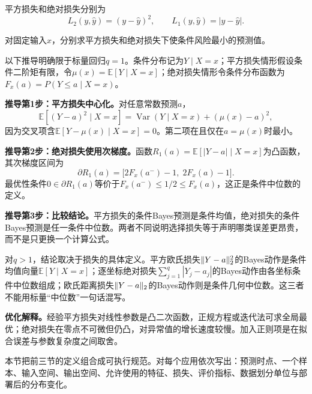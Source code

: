 平方损失和绝对损失分别为
\[
L_2(y,\hat y)=(y-\hat y)^2,\qquad
L_1(y,\hat y)=|y-\hat y|.
\]

\begin{derivationgoalbox}
对固定输入$x$，分别求平方损失和绝对损失下使条件风险最小的预测值。
\end{derivationgoalbox}
\begin{derivationprepbox}
以下推导明确限于标量回归$q=1$。条件分布记为$Y\mid X=x$；平方损失情形假设条件二阶矩有限，令$\mu(x)=\mathbb E[Y\mid X=x]$；绝对损失情形令条件分布函数为$F_x(a)=P(Y\le a\mid X=x)$。
\end{derivationprepbox}
\textbf{推导第1步：平方损失中心化。}对任意常数预测$a$，
\[
\mathbb E[(Y-a)^2\mid X=x]
=\operatorname{Var}(Y\mid X=x)+(\mu(x)-a)^2,
\]
因为交叉项含$\mathbb E[Y-\mu(x)\mid X=x]=0$。第二项在且仅在$a=\mu(x)$时最小。

\textbf{推导第2步：绝对损失使用次梯度。}函数$R_1(a)=\mathbb E[|Y-a|\mid X=x]$为凸函数，其次梯度区间为
\[
\partial R_1(a)=\bigl[2F_x(a^-)-1,\;2F_x(a)-1\bigr].
\]
最优性条件$0\in\partial R_1(a)$等价于$F_x(a^-)\le1/2\le F_x(a)$，这正是条件中位数的定义。

\textbf{推导第3步：比较结论。}平方损失的条件Bayes预测是条件均值，绝对损失的条件Bayes预测是任一条件中位数。两者不同说明选择损失等于声明哪类误差更昂贵，而不是只更换一个计算公式。

对$q>1$，结论取决于损失的具体定义。平方欧氏损失$\lVert Y-a\rVert_2^2$的Bayes动作是条件均值向量$\mathbb E[Y\mid X=x]$；逐坐标绝对损失$\sum_{j=1}^q|Y_j-a_j|$的Bayes动作由各坐标条件中位数组成；欧氏距离损失$\lVert Y-a\rVert_2$的Bayes动作则是条件几何中位数。这三者不能用标量“中位数”一句话混写。

\label{struct:V1-C11-CH16}
\begin{optimizationbox}
\textbf{优化解释。}经验平方损失对线性参数是凸二次函数，正规方程或迭代法可求全局最优；绝对损失在零点不可微但仍凸，对异常值的增长速度较慢。加入正则项是在拟合误差与参数复杂度之间取舍。
\end{optimizationbox}


本节把前三节的定义组合成可执行规范。对每个应用依次写出：预测时点、一个样本、输入空间、输出空间、允许使用的特征、损失、评价指标、数据划分单位与部署后的分布变化。

